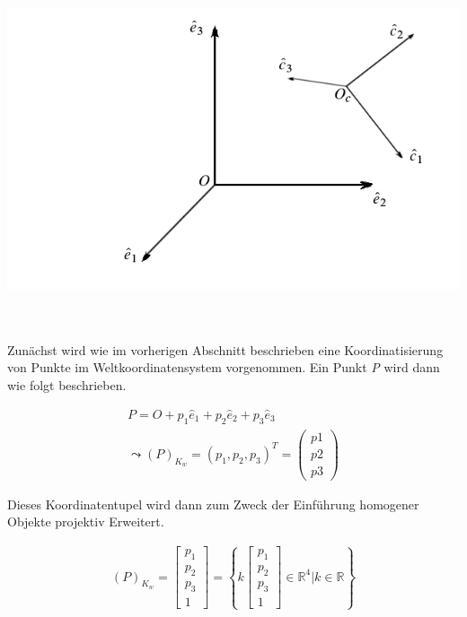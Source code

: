 	\begin{minipage}{\linewidth}
		\centering
		\includegraphics[width=1.\linewidth]{images/WeltKordSys.png}
	\end{minipage}\\ \\
	
	
	Zunächst wird wie im vorherigen Abschnitt beschrieben eine Koordinatisierung von Punkte im Weltkoordinatensystem vorgenommen. Ein Punkt \textit{P} wird dann wie folgt beschrieben.

	
	\begin{gather}
	P = O + p_1\hat{e}_1 + p_2\hat{e}_2 + p_3\hat{e}_3\\
	\leadsto(P)_{K_w} = (p_1,p_2,p_3)^T = \begin{pmatrix} p1 \\ p2 \\ p3 \end{pmatrix}
	\end{gather}
	
	Dieses Koordinatentupel wird dann zum Zweck der Einführung homogener Objekte projektiv Erweitert.
	
	\begin{gather}
	(P)_{K_w} = \begin{bmatrix} p_1 \\ p_2 \\ p_3 \\1 \end{bmatrix} = \left\{ k \begin{bmatrix} p_1\\p_2\\p_3\\1 \end{bmatrix} \in \mathbb{R} ^4 |  k \in \mathbb{R}\right\}
	\end{gather}
	
